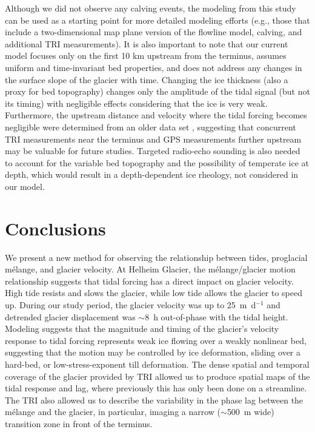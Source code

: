 Although we did not observe any calving events, the modeling from this study can be used as a starting point for more detailed modeling efforts (e.g., those that include a two-dimensional map plane version of the flowline model, calving, and additional TRI measurements). It is also important to note that our current model focuses only on the first 10 km upstream from the terminus, assumes uniform and time-invariant bed properties, and does not address any changes in the surface slope of the glacier with time.  Changing the ice thickness (also a proxy for bed topography) changes only the amplitude of the tidal signal (but not its timing) with negligible effects considering that the ice is very weak. Furthermore, the upstream distance and velocity where the tidal forcing becomes negligible were determined from an older data set \citep{verger2011tidewater}, suggesting that concurrent TRI measurements near the terminus and GPS measurements further upstream may be valuable for future studies. Targeted radio-echo sounding is also needed to account for the variable bed topography and the possibility of temperate ice at depth, which would result in a depth-dependent ice rheology, not considered in our model.



\section{Conclusions}
We present a new method for observing the relationship between tides, proglacial m\'elange, and glacier velocity. At Helheim Glacier, the m\'elange/glacier motion relationship suggests that tidal forcing has a direct impact on glacier velocity. High tide resists and slows the glacier, while low tide allows the glacier to speed up. During our study period, the glacier velocity was up to 25~m~d$^{-1}$ and detrended glacier displacement was $\sim$8~h out-of-phase with the tidal height.  Modeling suggests that the magnitude and timing of the glacier's velocity response to tidal forcing represents weak ice flowing over a weakly nonlinear bed, suggesting that the motion may be controlled by ice deformation, sliding over a hard-bed, or low-stress-exponent till deformation. The dense spatial and temporal coverage of the glacier provided by TRI allowed us to produce spatial maps of the tidal response and lag, where previously this has only been done on a streamline. The TRI also allowed us to describe the variability in the phase lag between the m\'elange and the glacier, in particular, imaging a narrow ($\sim$500~m wide) transition zone in front of the terminus.

